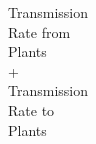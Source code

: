 \documentclass[preview]{standalone}
\begin{document}
\begin{center}
Transmission\\Rate from\\Plants\\+\\Transmission\\Rate to\\Plants
\end{center}
\end{document}
